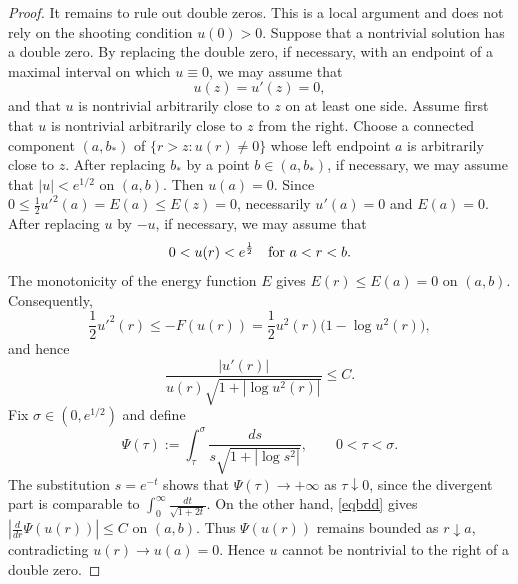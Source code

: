 \documentclass[11pt]{article}
\begin{document}
\begin{proof}
It remains to rule out double zeros.  This is a local argument and
does not rely on the shooting condition $u(0)>0$.  Suppose that a nontrivial solution has a double zero. By replacing the double zero, if necessary, with an endpoint of a maximal interval on which $u\equiv0$, we may assume that
\[
u(z)=u'(z)=0,
\]
and that $u$ is nontrivial arbitrarily close to $z$ on at least one side.
Assume first that $u$ is nontrivial arbitrarily close to $z$ from the right. {Choose a connected component $(a,b_*)$ of
$\{r>z:u(r)\ne0\}$ whose left endpoint $a$ is arbitrarily close to
$z$. After replacing $b_*$ by a point $b\in(a,b_*)$, if necessary,
we may assume that $|u|<e^{1/2}$ on $(a,b)$.}
Then $u(a)=0$.  Since
$0\leq\frac12u'^2(a)=E(a)\le E(z)=0$, necessarily $u'(a)=0$ and $E(a)=0$.  After replacing $u$ by $-u$, if necessary, we may assume that
\[
 0<u(r)<e^{\frac{1}{2}}\quad \hbox{for }a<r<b.
\]
The monotonicity of the energy function $E$ gives $E(r)\le E(a)=0$ on $(a,b)$.
Consequently,
\[
 \frac12u'^2(r)\le -F(u(r))
 ={\frac12u^2(r)\bigl(1-\log u^2(r)\bigr)},
\]
and hence
 \begin{equation}\label{eqbdd}
 \frac{|u'(r)|}{u(r)\sqrt{1+|\log u^2(r)|}}\le C.
 \end{equation}
Fix $\sigma\in(0,e^{1/2})$ and define
\begin{equation*}
\Psi(\tau):=\int_\tau^\sigma\frac{ds}{s\sqrt{1+|\log s^2|}},
\qquad 0<\tau<\sigma.
\end{equation*}
The substitution $s=e^{-t}$ shows that $\Psi(\tau)\rightarrow+\infty$ as $\tau\downarrow0$, since the divergent part is comparable to $\int_0^\infty\frac{dt}{\sqrt{1+2t}}$. On the other hand, \eqref{eqbdd} gives $\left|\frac{d}{dr}\Psi(u(r))\right|\le C$ on $(a,b)$. Thus $\Psi(u(r))$ remains bounded as $r\downarrow a$, contradicting
$u(r)\to u(a)=0$. Hence $u$ cannot be nontrivial to the right of a double zero.



\end{proof}
\end{document}
